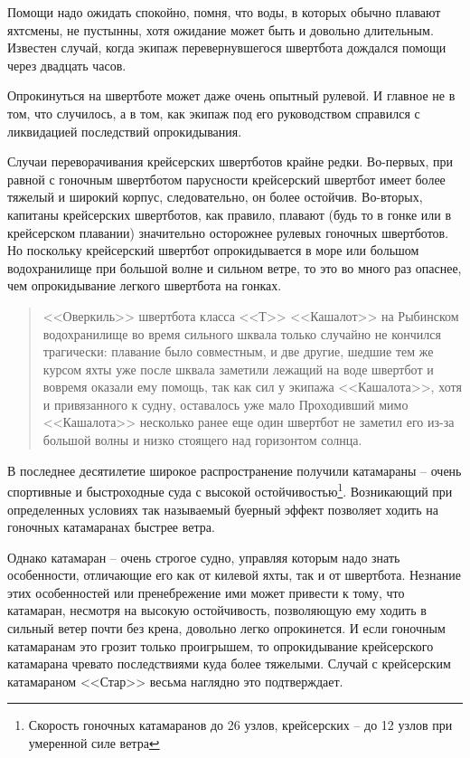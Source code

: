 \documentclass[a4paper, 12pt, twoside, final]{scrbook}
\begin{document}
Помощи надо ожидать спокойно, помня, что воды, в которых обычно плавают яхтсмены, не пустынны, хотя ожидание может быть и довольно длительным. Известен случай, когда экипаж перевернувшегося швертбота дождался помощи через двадцать часов.

Опрокинуться на швертботе может даже очень опытный рулевой. И главное не в том, что случилось, а в том, как экипаж под его руководством справился с ликвидацией последствий опрокидывания.

Случаи переворачивания крейсерских швертботов крайне редки. Во-первых, при равной с гоночным швертботом парусности крейсерский швертбот имеет более тяжелый и широкий корпус, следовательно, он более остойчив. Во-вторых, капитаны крейсерских швертботов, как правило, плавают (будь то в гонке или в крейсерском плавании) значительно осторожнее рулевых гоночных швертботов. Но поскольку крейсерский швертбот опрокидывается в море или большом водохранилище при большой волне и сильном ветре, то это во много раз опаснее, чем опрокидывание легкого швертбота на гонках.

\begin{quote}
<<Оверкиль>> швертбота класса <<Т>> <<Кашалот>> на Рыбинском водохранилище во время сильного шквала только случайно не кончился трагически: плавание было совместным, и две другие, шедшие тем же курсом яхты уже после шквала заметили лежащий на воде швертбот и вовремя оказали ему помощь, так как сил у экипажа <<Кашалота>>, хотя и привязанного к судну, оставалось уже мало Проходивший мимо <<Кашалота>> несколько ранее еще один швертбот не заметил его из-за большой волны и низко стоящего над горизонтом солнца.
\end{quote}

В последнее десятилетие широкое распространение получили катамараны \--- очень спортивные и быстроходные суда с высокой остойчивостью\footnote{Скорость гоночных катамаранов до 26 узлов, крейсерских \--- до 12 узлов при умеренной силе ветра}. Возникающий при определенных условиях так называемый буерный эффект позволяет ходить на гоночных катамаранах быстрее ветра.

Однако катамаран \--- очень строгое судно, управляя которым надо знать особенности, отличающие его как от килевой яхты, так и от швертбота. Незнание этих особенностей или пренебрежение ими может привести к тому, что катамаран, несмотря на высокую остойчивость, позволяющую ему ходить в сильный ветер почти без крена, довольно легко опрокинется. И если гоночным катамаранам это грозит только проигрышем, то опрокидывание крейсерского катамарана чревато последствиями куда более тяжелыми. Случай с крейсерским катамараном <<Стар>> весьма наглядно это подтверждает.
\end{document}
